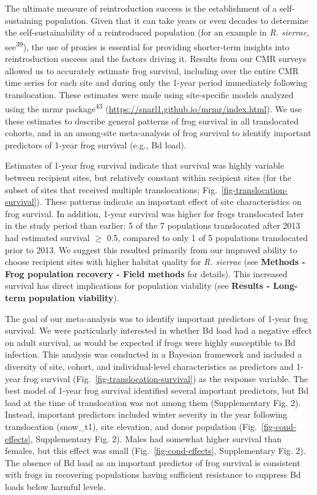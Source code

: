 \documentclass[
  letterpaper,
  DIV=11,
  numbers=noendperiod]{scrartcl}
\begin{document}
The ultimate measure of reintroduction success is the establishment of a
self-sustaining population. Given that it can take years or even decades
to determine the self-sustainability of a reintroduced population (for
an example in \emph{R. sierrae}, see\textsuperscript{39}), the use of
proxies is essential for providing shorter-term insights into
reintroduction success and the factors driving it. Results from our CMR
surveys allowed us to accurately estimate frog survival, including over
the entire CMR time series for each site and during only the 1-year
period immediately following translocation. These estimates were made
using site-specific models analyzed using the mrmr
package\textsuperscript{43}
(\url{https://snarl1.github.io/mrmr/index.html}). We use these estimates
to describe general patterns of frog survival in all translocated
cohorts, and in an among-site meta-analysis of frog survival to identify
important predictors of 1-year frog survival (e.g., Bd load).

Estimates of 1-year frog survival indicate that survival was highly
variable between recipient sites, but relatively constant within
recipient sites (for the subset of sites that received multiple
translocations; Fig.~\ref{fig-translocation-survival}). These patterns
indicate an important effect of site characteristics on frog survival.
In addition, 1-year survival was higher for frogs translocated later in
the study period than earlier: 5 of the 7 populations translocated after
2013 had estimated survival \(\ge\) 0.5, compared to only 1 of 5
populations translocated prior to 2013. We suggest this resulted
primarily from our improved ability to choose recipient sites with
higher habitat quality for \emph{R. sierrae} (see \textbf{Methods - Frog
population recovery - Field methods} for details). This increased
survival has direct implications for population viability (see
\textbf{Results - Long-term population viability}).

The goal of our meta-analysis was to identify important predictors of
1-year frog survival. We were particularly interested in whether Bd load
had a negative effect on adult survival, as would be expected if frogs
were highly susceptible to Bd infection. This analysis was conducted in
a Bayesian framework and included a diversity of site, cohort, and
individual-level characteristics as predictors and 1-year frog survival
(Fig.~\ref{fig-translocation-survival}) as the response variable. The
best model of 1-year frog survival identified several important
predictors, but Bd load at the time of translocation was not among them
(Supplementary Fig. 2). Instead, important predictors included winter
severity in the year following translocation (snow\_t1), site elevation,
and donor population (Fig.~\ref{fig-cond-effects}, Supplementary Fig.
2). Males had somewhat higher survival than females, but this effect was
small (Fig.~\ref{fig-cond-effects}, Supplementary Fig. 2). The absence
of Bd load as an important predictor of frog survival is consistent with
frogs in recovering populations having sufficient resistance to suppress
Bd loads below harmful levels.
\end{document}
